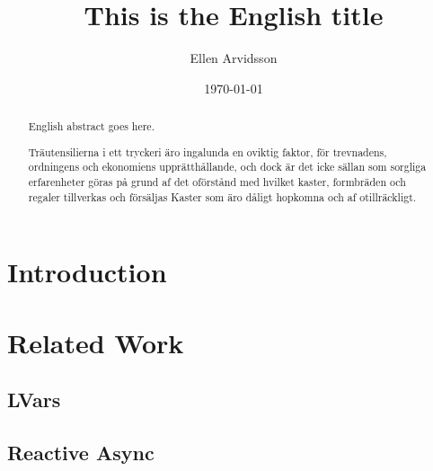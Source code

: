 \documentclass{kththesis}
\title{This is the English title}
\author{Ellen Arvidsson}
\date{\today}
\begin{document}
\frontmatter

\titlepage

\begin{abstract}
  English abstract goes here.

\end{abstract}


\begin{otherlanguage}{swedish}
  \begin{abstract}
    Träutensilierna i ett tryckeri äro ingalunda en oviktig faktor,
    för trevnadens, ordningens och ekonomiens upprätthållande, och
    dock är det icke sällan som sorgliga erfarenheter göras på grund
    af det oförstånd med hvilket kaster, formbräden och regaler
    tillverkas och försäljas Kaster som äro dåligt hopkomna och af
    otillräckligt.
  \end{abstract}
\end{otherlanguage}


\tableofcontents


\mainmatter

\chapter{Introduction}
\label{cha:introduction}




\chapter{Related Work}
\label{cha:related_work}

\section{LVars}
\label{sec:lvars}


\section{Reactive Async}
\label{sec:reactive_async}
\end{document}
